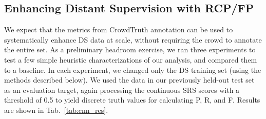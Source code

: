 \subsection{Enhancing Distant Supervision with RCP/FP}
We expect that the metrics from CrowdTruth annotation can be used to systematically enhance DS data at scale, without requiring the crowd to annotate the entire set.  As a preliminary headroom exercise, we ran three experiments to test a few simple heuristic characterizations of our analysis, and compared them to a baseline.  In each experiment, we changed only the DS training set (using the methods described below).  We used the data in our previously held-out test set as an evaluation target, again processing the continuous SRS scores with a threshold of 0.5 to yield discrete truth values for calculating P, R, and F.  Results are shown in Tab.~\ref{tab:cnn_res}.


